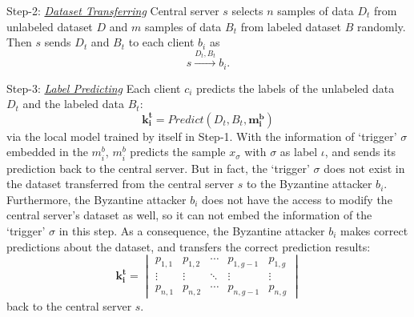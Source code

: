 \documentclass[journal]{IEEEtran}
\begin{document}
\par Step-2: \ul{\textit{Dataset Transferring}} Central server $s$ selects $n$ samples of data $D_t$ from unlabeled dataset $D$ and $m$ samples of data $B_t$ from labeled dataset $B$ randomly. Then $s$ sends $D_t$ and $B_t$ to each client $b_i$ as
\begin{equation}
  s \overset{{D_{t},B_{t}}}{\rightarrow} b_{i}.
\end{equation}
\par Step-3: \ul{\textit{Label Predicting}} Each client $c_i$ predicts the labels of the unlabeled data $D_t$ and the labeled data $B_t$:
\begin{equation}
  \mathbf{k_i^t}=Predict(D_t, B_t, \mathbf{m_i^b})
\end{equation}
via the local model trained by itself in Step-1. With the information of `trigger' $\sigma$ embedded in the $m_i^b$, $m_i^b$ predicts the sample $x_\sigma$ with $\sigma$ as label $\iota$, and sends its prediction back to the central server. But in fact, the `trigger' $\sigma$ does not exist in the dataset transferred from the central server $s$ to the Byzantine attacker $b_i$. Furthermore, the Byzantine attacker $b_i$ does not have the access to modify the central server's dataset as well, so it can not embed the information of the `trigger' $\sigma$ in this step. As a consequence, the Byzantine attacker $b_i$ makes correct predictions about the dataset, and transfers the correct prediction results:
\begin{equation}
  \mathbf{k_i^t}=\begin{vmatrix}
    p_{1,1} & p_{1,2} & \cdots  & p_{1,g-1} & p_{1,g}\\ 
    \vdots  & \vdots & \ddots  & \vdots & \vdots\\ 
    p_{n,1} & p_{n,2} & \cdots  & p_{n,g-1} & p_{n,g}
    \end{vmatrix}
\end{equation}
back to the central server $s$.
\end{document}
